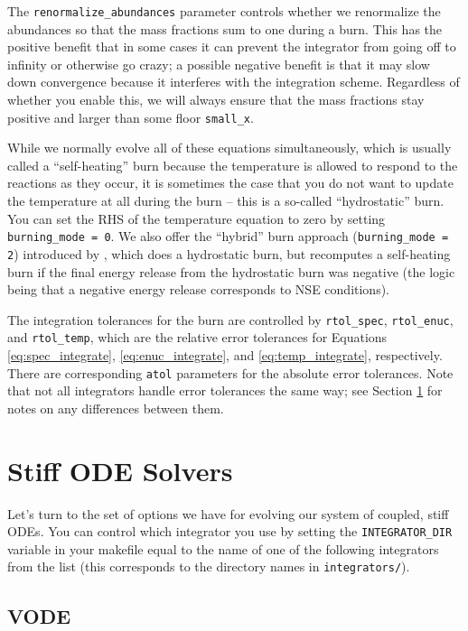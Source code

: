 The \texttt{renormalize\_abundances} parameter controls whether we renormalize
the abundances so that the mass fractions sum to one during a burn. This
has the positive benefit that in some cases it can prevent the integrator
from going off to infinity or otherwise go crazy; a possible negative benefit
is that it may slow down convergence because it interferes with the integration
scheme. Regardless of whether you enable this, we will always ensure that the
mass fractions stay positive and larger than some floor \texttt{small\_x}.

While we normally evolve all of these equations simultaneously, which is
usually called a ``self-heating'' burn because the temperature is allowed
to respond to the reactions as they occur, it is
sometimes the case that you do not want to update the temperature at all
during the burn -- this is a so-called ``hydrostatic'' burn. You can
set the RHS of the temperature equation to zero by setting
\texttt{burning\_mode = 0}. We also offer the ``hybrid'' burn approach
(\texttt{burning\_mode = 2}) introduced by \cite{raskin:2010}, which
does a hydrostatic burn, but recomputes a self-heating burn if the
final energy release from the hydrostatic burn was negative (the
logic being that a negative energy release corresponds to NSE conditions).

The integration tolerances for the burn are controlled by \texttt{rtol\_spec},
\texttt{rtol\_enuc}, and \texttt{rtol\_temp}, which are the relative error
tolerances for Equations \ref{eq:spec_integrate}, \ref{eq:enuc_integrate},
and \ref{eq:temp_integrate}, respectively. There are corresponding \texttt{atol}
parameters for the absolute error tolerances. Note that not all integrators
handle error tolerances the same way; see Section \ref{sec:stiff_solvers} for
notes on any differences between them.

\section{Stiff ODE Solvers}
\label{sec:stiff_solvers}

Let's turn to the set of options we have for evolving our system of coupled,
stiff ODEs. You can control which integrator you use by setting the
\texttt{INTEGRATOR\_DIR} variable in your makefile equal to the name of
one of the following integrators from the list (this corresponds to the
directory names in \texttt{integrators/}).

\subsection{VODE}
\label{sec:VODE}

